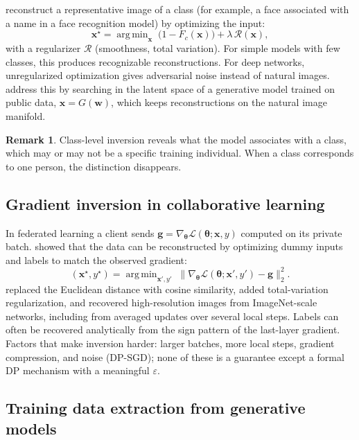 \documentclass[10pt,a4paper]{extarticle}
\theoremstyle{definition}
\newtheorem{remark}{Remark}[section]
\newcommand{\Loss}{\mathcal{L}}
\newcommand{\x}{\mathbf{x}}
\newcommand{\btheta}{\boldsymbol{\theta}}
\DeclareMathOperator*{\argmin}{arg\,min}
\begin{document}
\citet{fredrikson2015model} reconstruct a representative image of a class (for example, a face associated with a name in a face recognition model) by optimizing the input:
\[
\x^\star = \argmin_{\x}\;\big(1-F_c(\x)\big) + \lambda\,\mathcal{R}(\x),
\]
with a regularizer \(\mathcal{R}\) (smoothness, total variation). For simple models with few classes, this produces recognizable reconstructions. For deep networks, unregularized optimization gives adversarial noise instead of natural images. \citet{zhang2020secret} address this by searching in the latent space of a generative model trained on public data, \(\x=G(\mathbf{w})\), which keeps reconstructions on the natural image manifold.

\begin{remark}
Class-level inversion reveals what the model associates with a class, which may or may not be a specific training individual. When a class corresponds to one person, the distinction disappears.
\end{remark}

\subsection{Gradient inversion in collaborative learning}

In federated learning a client sends \(\mathbf{g}=\nabla_{\btheta}\Loss(\btheta;\x,y)\) computed on its private batch. \citet{zhu2019deep} showed that the data can be reconstructed by optimizing dummy inputs and labels to match the observed gradient:
\begin{equation}\label{eq:dlg}
(\x^\star,y^\star) = \argmin_{\x',y'}\;\big\|\nabla_{\btheta}\Loss(\btheta;\x',y')-\mathbf{g}\big\|_2^2.
\end{equation}
\citet{geiping2020inverting} replaced the Euclidean distance with cosine similarity, added total-variation regularization, and recovered high-resolution images from ImageNet-scale networks, including from averaged updates over several local steps. Labels can often be recovered analytically from the sign pattern of the last-layer gradient. Factors that make inversion harder: larger batches, more local steps, gradient compression, and noise (DP-SGD); none of these is a guarantee except a formal DP mechanism with a meaningful \(\varepsilon\).

\subsection{Training data extraction from generative models}
\end{document}
